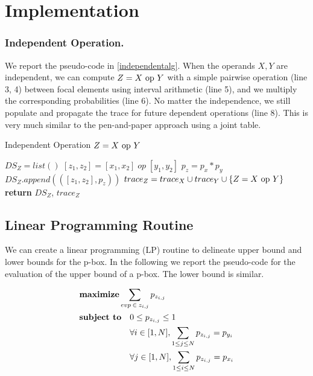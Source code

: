 \section{Implementation}\label{sec:appdx-implementation}

\subsubsection{Independent Operation.}\label{sec:appdx-independent}
We report the pseudo-code in \cref{independentalg}.
%
When the operands $X,Y$ are independent, we can compute $Z=X~\mathrm{op}~ Y$ with a simple pairwise operation (line 3, 4) between focal elements using interval arithmetic (line 5), and we multiply the corresponding probabilities (line 6).  
%
No matter the independence, we still populate and propagate the trace for future dependent operations (line 8).
%
This is very much similar to the pen-and-paper approach using a joint table.
% 
\begin{algorithm}[H]
	\caption{Independent Operation $Z=X~\mathrm{op}~ Y$}\label{independentalg}
	\begin{algorithmic}[1]
		\State $DS_Z=list()$
		\State $[z_1, z_2]=[x_1, x_2]\;op\;[y_1, y_2]$ 
		\State $p_{z}=p_{x}*p_{y}$
		\State $DS_Z.append(([z_1, z_2],p_z))$
		\EndFor
		\EndFor
		\State $trace_Z=trace_X \cup trace_Y\cup\{Z=X~\mathrm{op}~ Y\}$
		\State \textbf{return} $DS_Z$, $trace_Z$
		\EndFunction
	\end{algorithmic}
\end{algorithm}

\subsection{Linear Programming Routine}\label{sec:appdx-lp}
We can create a linear programming (LP) routine to delineate upper bound and lower bounds for the p-box.
%
In the following we report the pseudo-code for the evaluation of the upper bound of a p-box. The lower bound is similar.
%

\begin{align*}
&\text{\textbf{maximize}}\sum_{evp\:\in\:z_{i,j}} p_{z_{i,j}}\\
&\text{\textbf{subject to}}\quad 0\leq p_{z_{i,j}}\leq 1\\
&\qquad\qquad\quad\quad \forall i \in [1,N], \sum_{1\leq j\leq N} p_{z_{i,j}} = p_{y_{i}} \\
&\qquad\qquad\quad\quad \forall j \in [1,N], \sum_{1\leq i\leq N} p_{z_{i,j}} = p_{x_{i}}\\
\end{align*}
%


